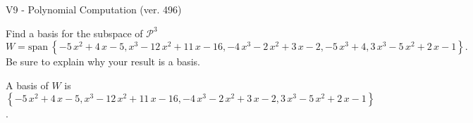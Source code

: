 \begin{exercise}
  \begin{exerciseTitle}V9 - Polynomial Computation (ver. 496)\end{exerciseTitle}
  \begin{exerciseStatement}
    Find a basis for the subspace of \(\mathcal{P}^3\) 
\[W=\mathrm{span}\ \left\{-5 \, x^{2} + 4 \, x - 5 , x^{3} - 12 \, x^{2} + 11 \, x - 16 , -4 \, x^{3} - 2 \, x^{2} + 3 \, x - 2 , -5 \, x^{3} + 4 , 3 \, x^{3} - 5 \, x^{2} + 2 \, x - 1\right\}.\]
 Be sure to explain why your result is a basis.


  \end{exerciseStatement}
  \begin{exerciseAnswer}
   A basis of \(W\) is  \(\left\{-5 \, x^{2} + 4 \, x - 5 , x^{3} - 12 \, x^{2} + 11 \, x - 16 , -4 \, x^{3} - 2 \, x^{2} + 3 \, x - 2 , 3 \, x^{3} - 5 \, x^{2} + 2 \, x - 1\right\}\).
  


  \end{exerciseAnswer}
\end{exercise}